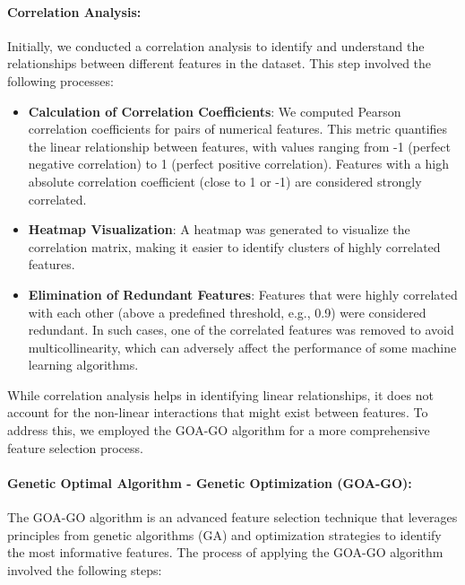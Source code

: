 \paragraph{Correlation Analysis: \\}
Initially, we conducted a correlation analysis to identify and understand the relationships between different features in the dataset. This step involved the following processes:
\begin{itemize}
    \item \textbf{Calculation of Correlation Coefficients}: We computed Pearson correlation coefficients for pairs of numerical features. This metric quantifies the linear relationship between features, with values ranging from -1 (perfect negative correlation) to 1 (perfect positive correlation). Features with a high absolute correlation coefficient (close to 1 or -1) are considered strongly correlated.
    \item \textbf{Heatmap Visualization}: A heatmap was generated to visualize the correlation matrix, making it easier to identify clusters of highly correlated features.
    \item \textbf{Elimination of Redundant Features}: Features that were highly correlated with each other (above a predefined threshold, e.g., 0.9) were considered redundant. In such cases, one of the correlated features was removed to avoid multicollinearity, which can adversely affect the performance of some machine learning algorithms.
\end{itemize}
While correlation analysis helps in identifying linear relationships, it does not account for the non-linear interactions that might exist between features. To address this, we employed the GOA-GO algorithm for a more comprehensive feature selection process.
\paragraph{Genetic Optimal Algorithm - Genetic Optimization (GOA-GO):\\}
The GOA-GO algorithm is an advanced feature selection technique that leverages principles from genetic algorithms (GA) and optimization strategies to identify the most informative features. The process of applying the GOA-GO algorithm involved the following steps:

